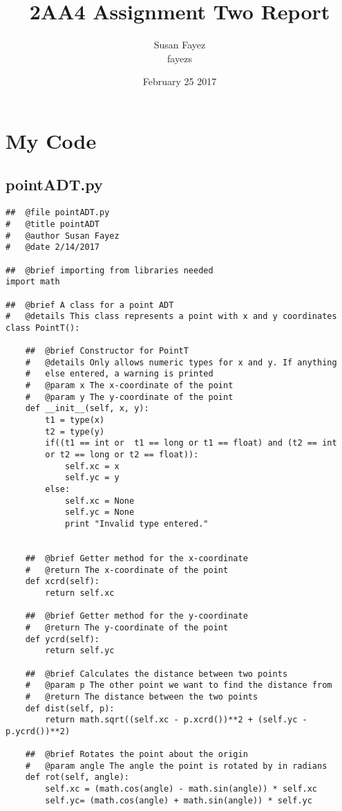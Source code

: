 \documentclass{article}
\title{2AA4 Assignment Two Report}
\author{Susan Fayez \\ fayezs}
\date{February 25 2017}
\begin{document}
\maketitle

\section{My Code}

\subsection{pointADT.py}
\begin{lstlisting}
##  @file pointADT.py
#   @title pointADT
#   @author Susan Fayez
#   @date 2/14/2017

##  @brief importing from libraries needed
import math

##  @brief A class for a point ADT
#   @details This class represents a point with x and y coordinates   
class PointT():
    
    ##  @brief Constructor for PointT
    #   @details Only allows numeric types for x and y. If anything 
    #   else entered, a warning is printed
    #   @param x The x-coordinate of the point
    #   @param y The y-coordinate of the point
    def __init__(self, x, y):
        t1 = type(x)
        t2 = type(y)
        if((t1 == int or  t1 == long or t1 == float) and (t2 == int 
        or t2 == long or t2 == float)):
            self.xc = x
            self.yc = y
        else:
            self.xc = None
            self.yc = None
            print "Invalid type entered."
        

    ##  @brief Getter method for the x-coordinate
    #   @return The x-coordinate of the point
    def xcrd(self):
        return self.xc

    ##  @brief Getter method for the y-coordinate
    #   @return The y-coordinate of the point
    def ycrd(self):
        return self.yc

    ##  @brief Calculates the distance between two points
    #   @param p The other point we want to find the distance from
    #   @return The distance between the two points
    def dist(self, p):
        return math.sqrt((self.xc - p.xcrd())**2 + (self.yc - p.ycrd())**2)

    ##  @brief Rotates the point about the origin
    #   @param angle The angle the point is rotated by in radians
    def rot(self, angle):
        self.xc = (math.cos(angle) - math.sin(angle)) * self.xc
        self.yc= (math.cos(angle) + math.sin(angle)) * self.yc
    
\end{lstlisting}
\end{document}
